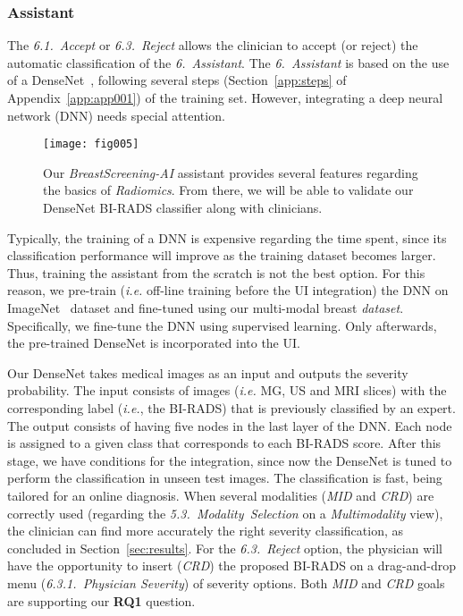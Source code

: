 \subsubsection{Assistant}

The {\it 6.1.~Accept} or {\it 6.3.~Reject} allows the clinician to accept (or reject) the automatic classification of the {\it 6.~Assistant}.
The {\it 6.~Assistant} is based on the use of a DenseNet~\cite{huang2017densely}, following several steps (Section~\ref{app:steps} of Appendix~\ref{app:app001}) of the training set.
However, integrating a deep neural network (DNN) needs special attention.

\begin{figure}[htbp]
\centering
\texttt{[image: fig005]}
\caption{Our {\it BreastScreening-AI} assistant provides several features regarding the basics of {\it Radiomics}. From there, we will be able to validate our DenseNet BI-RADS classifier along with clinicians.}
\label{fig:fig005}
\end{figure}

Typically, the training of a DNN is expensive regarding the time spent, since its classification performance will improve as the training dataset becomes larger.
Thus, training the assistant from the scratch is not the best option.
For this reason, we pre-train ({\it i.e.} off-line training before the UI integration) the DNN on ImageNet~\cite{deng2009imagenet} dataset and fine-tuned using our multi-modal breast {\it dataset}.
Specifically, we fine-tune the DNN using supervised learning.
Only afterwards, the pre-trained DenseNet is incorporated into the UI.

Our DenseNet takes medical images as an input and outputs the severity probability.
The input consists of images ({\it i.e.} MG, US and MRI slices) with the corresponding label ({\it i.e.}, the BI-RADS) that is previously classified by an expert.
The output consists of having five nodes in the last layer of the DNN.
Each node is assigned to a given class that corresponds to each BI-RADS score.
After this stage, we have conditions for the integration, since now the DenseNet is tuned to perform the classification in unseen test images.
The classification is fast, being tailored for an online diagnosis.
When several modalities ({\it MID} and {\it CRD}) are correctly used (regarding the {\it 5.3.~Modality~Selection} on a {\it Multimodality} view), the clinician can find more accurately the right severity classification, as concluded in Section~\ref{sec:results}.
For the {\it 6.3.~Reject} option, the physician will have the opportunity to insert ({\it CRD}) the proposed BI-RADS on a drag-and-drop menu ({\it 6.3.1.~Physician Severity}) of severity options.
Both {\it MID} and {\it CRD} goals are supporting our {\bf RQ1} question.

